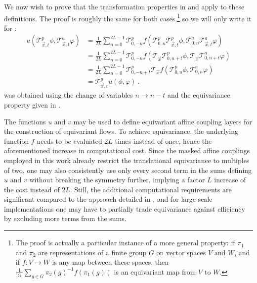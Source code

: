 \documentclass[aps,prd,twocolumn,nofootinbib,superscriptaddress,preprintnumbers]{revtex4-1}
\begin{document}
We now wish to prove that the transformation properties in  and  apply to these definitions. The proof is roughly the same for both cases,\footnote{The proof is actually a particular instance of a more general property: if $\pi_1$ and $\pi_2$ are representations of a finite group $G$ on vector spaces $V$ and $W$, and if $f:V\rightarrow W$ is any map between these spaces, then $\frac{1}{|G|}\sum_{g\in G}\pi_2(g)^{-1}f(\pi_1(g))$ is an equivariant map from $V$ to $W$.} so we will only write it for :
%
\begin{equation}
\begin{aligned}
    u(\mathcal{T}^p_{\vec{x}, t}\phi, \mathcal{T}^a_{\vec{x}, t}\varphi) &= \frac{1}{2L}\sum_{n=0}^{2L-1}\mathcal{T}^p_{0,-n}f(\mathcal{T}^p_{0,n}\mathcal{T}^p_{\vec{x}, t}\phi, \mathcal{T}^a_{0,n}\mathcal{T}^a_{\vec{x}, t}\varphi)  \\
    &= \frac{1}{2L}\sum_{n=0}^{2L-1}\mathcal{T}^p_{0,-n}f(\mathcal{T}_{\vec{x}}\mathcal{T}^p_{0,n+t}\phi, \mathcal{T}_{\vec{x}}\mathcal{T}^a_{0,n+t}\varphi)  \\
    &= \frac{1}{2L}\sum_{n=0}^{2L-1}\mathcal{T}^p_{0,-n+t}\mathcal{T}_{\vec{x}}f(\mathcal{T}^p_{0,n}\phi, \mathcal{T}^a_{0,n}\varphi)\label{eq:s-equivariance-step}\\
    &= \mathcal{T}^p_{\vec{x}, t}u(\phi, \varphi) \ .
\end{aligned}
\end{equation}
%
 was obtained using the change of variables $n\rightarrow n-t$ and the equivariance property given in .

The functions $u$ and $v$ may be used to define equivariant affine coupling layers for the construction of equivariant flows. To achieve equivariance, the underlying function $f$ needs to be evaluated $2L$ times instead of once, hence the aforementioned increase in computational cost. Since the masked affine couplings employed in this work already restrict the translational equivariance to multiples of two, one may also consistently use only every second term in the sums defining $u$ and $v$ without breaking the symmetry further, implying a factor $L$ increase of the cost instead of $2L$. Still, the additional computational requirements are significant compared to the approach detailed in , and for large-scale implementations one may have to partially trade equivariance against efficiency by excluding more terms from the sums.

\newpage


\end{document}
